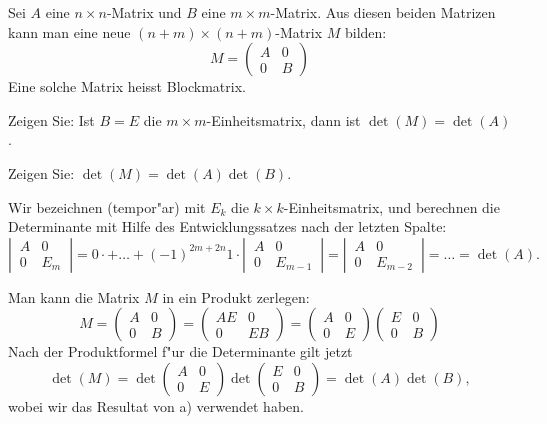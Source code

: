 Sei $A$ eine $n\times n$-Matrix und $B$ eine $m\times m$-Matrix. Aus diesen beiden
Matrizen kann man eine neue $(n+m)\times(n+m)$-Matrix $M$ bilden:
\[
M=\begin{pmatrix}
A&0\\
0&B
\end{pmatrix}
\]
Eine solche Matrix heisst Blockmatrix.
\begin{teilaufgaben}
\item
Zeigen Sie:
Ist $B=E$ die $m\times m$-Einheitsmatrix, dann ist $\det(M)=\det(A)$.
\item
Zeigen Sie:
$\det(M)=\det(A)\det(B)$.
\end{teilaufgaben}

\begin{loesung}
\begin{teilaufgaben}
\item Wir bezeichnen (tempor"ar) mit $E_k$ die $k\times k$-Einheitsmatrix,
und berechnen die Determinante mit Hilfe des Entwicklungssatzes nach der
letzten Spalte:
\[
\left|\,
\begin{matrix}
A&0\\
0&E_m
\end{matrix}
\,\right|
=0\cdot +\dots+(-1)^{2m+2n}1\cdot
\left|\,
\begin{matrix}
A&0\\
0&E_{m-1}
\end{matrix}
\,\right|
=
\left|\,
\begin{matrix}
A&0\\
0&E_{m-2}
\end{matrix}
\,\right|
=\dots=
\det(A).
\]

\item
Man kann die Matrix $M$ in ein Produkt zerlegen:
\[
M=
\begin{pmatrix}
A&0\\
0&B
\end{pmatrix}
=
\begin{pmatrix}
AE&0\\
0&EB
\end{pmatrix}
=
\begin{pmatrix}
A&0\\
0&E
\end{pmatrix}
\begin{pmatrix}
E&0\\
0&B
\end{pmatrix}
\]
Nach der Produktformel f"ur die Determinante gilt jetzt
\[
\det(M) =
\det
\begin{pmatrix}
A&0\\
0&E
\end{pmatrix}
\det
\begin{pmatrix}
E&0\\
0&B
\end{pmatrix}
=\det(A)\det(B),
\]
wobei wir das Resultat von a) verwendet haben.
\qedhere
\end{teilaufgaben}
\end{loesung}

